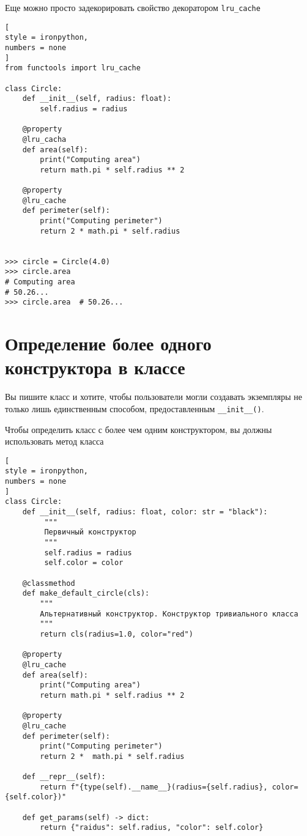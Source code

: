 \documentclass[%
	11pt,
	a4paper,
	utf8,
		]{article}
\begin{document}
Еще можно просто задекорировать свойство декоратором \texttt{lru\_cache}
\begin{lstlisting}[
style = ironpython,
numbers = none
]
from functools import lru_cache

class Circle:
    def __init__(self, radius: float):
        self.radius = radius
        
    @property
    @lru_cacha
    def area(self):
        print("Computing area")
        return math.pi * self.radius ** 2
        
    @property
    @lru_cache
    def perimeter(self):
        print("Computing perimeter")
        return 2 * math.pi * self.radius
        
        
>>> circle = Circle(4.0)
>>> circle.area
# Computing area
# 50.26...
>>> circle.area  # 50.26...
\end{lstlisting}


\section{Определение более одного конструктора в классе}

Вы пишите класс и хотите, чтобы пользователи могли создавать экземпляры не только лишь единственным способом, предоставленным \verb|__init__()|.

Чтобы определить класс с более чем одним конструктором, вы должны использовать метод класса
\begin{lstlisting}[
style = ironpython,
numbers = none
]
class Circle:
    def __init__(self, radius: float, color: str = "black"):
         """
         Первичный конструктор
         """
         self.radius = radius
         self.color = color
    
    @classmethod
    def make_default_circle(cls):
        """
        Альтернативный конструктор. Конструктор тривиального класса
        """
        return cls(radius=1.0, color="red")
    
    @property
    @lru_cache
    def area(self):
        print("Computing area")
        return math.pi * self.radius ** 2
    
    @property
    @lru_cache
    def perimeter(self):
        print("Computing perimeter")
        return 2 *  math.pi * self.radius
    
    def __repr__(self):
        return f"{type(self).__name__}(radius={self.radius}, color={self.color})"
    
    def get_params(self) -> dict:
        return {"raidus": self.radius, "color": self.color}
\end{lstlisting}
\end{document}
